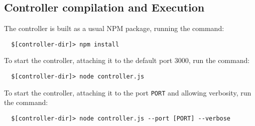 \subsection{Controller compilation and Execution}
\label{sec:controller-compilation-execution}

The controller is built as a usual NPM package, running the command:

\begin{verbatim}
  $[controller-dir]> npm install
\end{verbatim}

To start the controller, attaching it to the default port 3000, run the command:

\begin{verbatim}
  $[controller-dir]> node controller.js
\end{verbatim}

To start the controller, attaching it to the port \texttt{PORT} and allowing verbosity, run the command:

\begin{verbatim}
  $[controller-dir]> node controller.js --port [PORT] --verbose
\end{verbatim}
